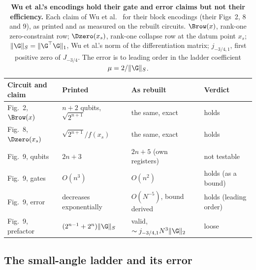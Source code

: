 \begin{table}[htbp]
    \centering
    \caption[Wu et al.'s encodings against their printed claims]{\textbf{Wu et al.'s encodings hold their gate and error claims but not their efficiency.} Each claim of Wu et al.\ \cite{wu2025pihm} for their block encodings (their Figs~2, 8 and 9), as printed and as measured on the rebuilt circuits. $\Brow(x)$, rank-one zero-constraint row; $\Dzero(x_s)$, rank-one collapse row at the datum point $x_s$; $\|\G\|_S=\|\G^\top\G\|_1$, Wu et al.'s norm of the differentiation matrix; $j_{-3/4,1}$, first positive zero of $J_{-3/4}$. The error is to leading order in the ladder coefficient $\mu=2/\|\G\|_S$.}
    \label{tab:published-verdicts}
    \small
    \begin{tabular}{@{}l l l l@{}}
        \toprule
        Circuit and claim & Printed & As rebuilt & Verdict \\
        \midrule
        Fig.~2, $\Brow(x)$ & $n+2$ qubits, $\sqrt{2^{n+1}}$ & the same, exact & holds \\
        Fig.~8, $\Dzero(x_s)$ & $\sqrt{2^{n+1}}/f(x_s)$ & the same, exact & holds \\
        Fig.~9, qubits & $2n+3$ & $2n+5$ (own registers) & not testable \\
        Fig.~9, gates & $O(n^3)$ & $O(n^2)$ & holds (as a bound) \\
        Fig.~9, error & decreases exponentially & $O(N^{-5})$, bound derived & holds (leading order) \\
        Fig.~9, prefactor & $(2^{n-1}+2^n)\|\G\|_S$ & valid, $\sim j_{-3/4,1}N^3\|\G\|_2$ & loose \\
        \bottomrule
    \end{tabular}
\end{table}

\subsection{The small-angle ladder and its error}
\label{app:ladder}

